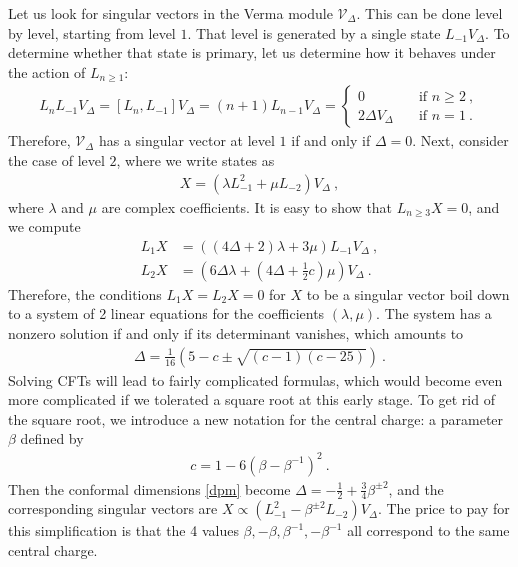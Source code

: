 \documentclass[12pt, a4paper]{article}
\begin{document}
Let us look for singular vectors in the Verma module $\mathcal{V}_\Delta$. This can be done level by level, starting from level $1$. That level is generated by a single state $L_{-1}V_\Delta$. To determine whether that state is primary, let us determine how it behaves under the action of $L_{n\geq 1}$:
\begin{align}
L_n L_{-1}V_\Delta = [L_n, L_{-1}] V_\Delta = (n+1) L_{n-1}V_\Delta = 
\left\{\begin{array}{ll} 0 &  \quad \text{if } n\geq 2\ , \\ 2\Delta V_\Delta & \quad \text{if } n = 1\ . \end{array}\right. 
\end{align}
Therefore, $\mathcal{V}_\Delta$ has a singular vector at level $1$ if and only if $\Delta=0$. Next, consider the case of level $2$, where we write states as
\begin{align}
 X{} = \left(\lambda L_{-1}^2 + \mu L_{-2}\right) V_\Delta\ ,
\end{align}
where $\lambda$ and $\mu$ are complex coefficients. It is easy to show that $L_{n\geq 3}X{}=0$, and we compute 
\begin{subequations}
\label{l1x}
\begin{align}
 L_1X{} &= \left((4\Delta+2)\lambda + 3\mu\right) L_{-1}V_\Delta\ ,
\\
L_2 X{} &= \left(6\Delta \lambda+(4\Delta+\tfrac12 c) \mu\right)V_\Delta\ .
\end{align}
\end{subequations}
Therefore, the conditions $L_1X{}=L_2 X{}=0$ for $X{}$ to be a singular vector boil down to a system of 2 linear equations for the coefficients $(\lambda,\mu)$. The system has a nonzero solution if and only if its determinant vanishes, which amounts to
\begin{align}
 \Delta = \frac{1}{16}\left( 5-c\pm\sqrt{(c-1)(c-25)} \right) \ .
 \label{dpm}
\end{align}
Solving CFTs will lead to fairly complicated formulas, which would become even more complicated if we tolerated a square root at this early stage.
To get rid of the square root, we introduce a new notation for the central charge: a parameter $\beta$ defined by
\begin{align}
 \boxed{c = 1- 6\left(\beta - \beta^{-1}\right)^2 } \ .
 \label{cb}
\end{align}
Then the conformal dimensions \eqref{dpm} become 
$
 \Delta = -\frac12 + \frac34\beta^{\pm 2}
$, and the corresponding singular vectors are $X\propto \left(L_{-1}^2 -\beta^{\pm 2}L_{-2}\right)V_\Delta$.
The price to pay for this simplification is that the 4 values $\beta,-\beta,\beta^{-1},-\beta^{-1}$ all correspond to the same central charge. 
\end{document}

